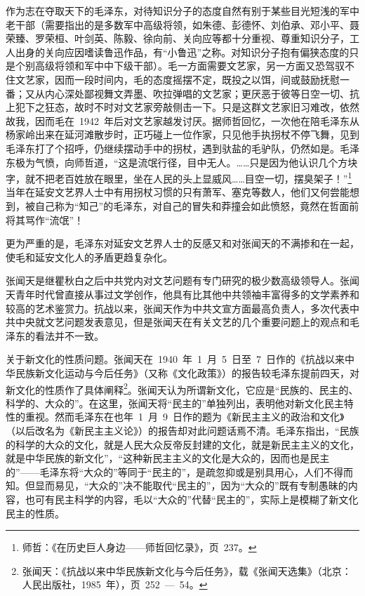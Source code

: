 作为志在夺取天下的毛泽东，对待知识分子的态度自然有别于某些目光短浅的军中老干部（需要指出的是多数军中高级将领，如朱德、彭德怀、刘伯承、邓小平、聂荣臻、罗荣桓、叶剑英、陈毅、徐向前、关向应等都十分重视、尊重知识分子，工人出身的关向应因嗜读鲁迅作品，有“小鲁迅”之称。对知识分子抱有偏狭态度的只是个别高级将领和军中中下级干部）。毛一方面需要文艺家，另一方面又恐驾驭不住文艺家，因而一段时间内，毛的态度摇摆不定，既投之以饵，间或鼓励抚慰一番；又从内心深处鄙视舞文弄墨、吹拉弹唱的文艺家；更厌恶于彼等日空一切、抗上犯下之狂态，故时不时对文艺家旁敲侧击一下。只是这群文艺家旧习难改，依然故我，因而毛在~1942~年后对文艺家越发讨厌。据师哲回忆，一次他在陪毛泽东从杨家岭出来在延河滩散步时，正巧碰上一位作家，只见他手执拐杖不停飞舞，见到毛泽东打了个招呼，仍继续摆动手中的拐杖，遇到驮盐的毛驴队，仍然如是。毛泽东极为气愤，向师哲道，“这是流氓行径，目中无人。……只是因为他认识几个方块字，就不把老百姓放在眼里，坐在人民的头上显威风……目空一切，摆臭架子！”\footnote{师哲：《在历史巨人身边——师哲回忆录》，页~237。}当年在延安文艺界人士中有用拐杖习惯的只有萧军、塞克等数人，他们又何尝能想到，被自己称为“知己”的毛泽东，对自己的冒失和莽撞会如此愤怒，竟然在哲面前将其骂作“流氓”！

更为严重的是，毛泽东对延安文艺界人士的反感又和对张闻天的不满掺和在一起，使毛和延安文化人的矛盾更趋复杂化。

张闻天是继瞿秋白之后中共党内对文艺问题有专门研究的极少数高级领导人。张闻天青年时代曾直接从事过文学创作，他具有比其他中共领袖丰富得多的文学素养和较高的艺术鉴赏力。抗战以来，张闻天作为中共文宣方面最高负责人，多次代表中共中央就文艺问题发表意见，但是张闻天在有关文艺的几个重要问题上的观点和毛泽东的看法并不一致。

关于新文化的性质问题。张闻天在~1940~年~1~月~5~日至~7~日作的《抗战以来中华民族新文化运动与今后任务》（又称《文化政策》）的报告较毛泽东提前四天，对新文化的性质作了具体阐释\footnote{张闻天：《抗战以来中华民族新文化与今后任务》，载《张闻天选集》（北京：人民出版社，1985~年），页~252~—~54。}。张闻天认为所谓新文化，它应是“民族的、民主的、科学的、大众的”。在这里，张闻天将“民主的”单独列出，表明他对新文化民主特性的重视。然而毛泽东在也年~1~月~9~日作的题为《新民主主义的政治和文化》（以后改名为《新民主主义论》）的报告却对此问题话焉不清。毛泽东指出，“民族的科学的大众的文化，就是人民大众反帝反封建的文化，就是新民主主义的文化，就是中华民族的新文化”，“这种新民主主义的文化是大众的，因而也是民主的”——毛泽东将“大众的”等同于“民主的”，是疏忽抑或是别具用心，人们不得而知。但显而易见，“大众的”决不能取代“民主的”，因为“大众的”既有专制愚昧的内容，也可有民主科学的内容，毛以“大众的”代替“民主的”，实际上是模糊了新文化民主的性质。

